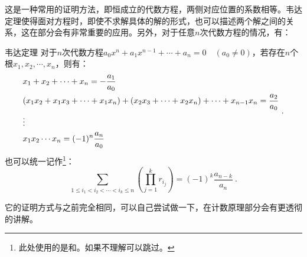 这是一种常用的证明方法，即恒成立的代数方程，两侧对应位置的系数相等。韦达定理使得面对方程时，即使不求解具体的解的形式，也可以描述两个解之间的关系，这在部分会有非常重要的应用。另外，对于任意$n$次代数方程的情况，有：
\begin{theorem}{韦达定理}
对于$n$次代数方程$a_0x^n+a_1x^{n-1}+\cdots+a_n=0\quad(a_0\neq0)$，若存在$n$个根$x_1,x_2,\cdots,x_n$，则有：
\begin{equation}
\begin{split}
&x_1+x_2+\cdots +x_n=-{a_1\over a_0}\\
&(x_1x_2+x_1x_3+\cdots+ x_1x_n)+(x_2x_3+\cdots +x_2x_n)+\cdots+x_{n-1}x_n={a_2\over a_0}\\
&\vdots\\
&x_1x_2\cdots x_n=(-1)^n{a_n\over a_0}
\end{split}~.
\end{equation}
也可以统一记作\footnote{此处使用的是和。如果不理解可以跳过。}：
\begin{equation}
\sum_{1\le i_1 < i_2 < \cdots < i_k\le n} \left(\prod_{j = 1}^k r_{i_j}\right)=(-1)^k\frac{a_{n-k}}{a_n}~.
\end{equation}
\end{theorem}

它的证明方式与之前完全相同，可以自己尝试做一下，在计数原理部分会有更透彻的讲解。